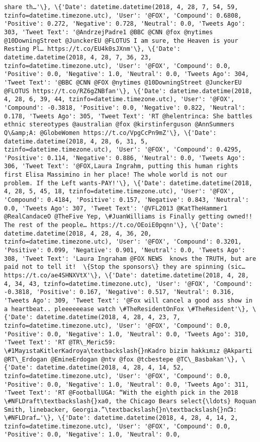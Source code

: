 \documentclass[11pt]{article}
\begin{document}
\begin{Verbatim}[commandchars=\\\{\}]
share th…'\}, \{'Date': datetime.datetime(2018, 4, 28, 7, 54, 59, tzinfo=datetime.timezone.utc), 'User': '@FOX', 'Compound': 0.6808, 'Positive': 0.272, 'Negative': 0.728, 'Neutral': 0.0, 'Tweets Ago': 303, 'Tweet Text': '@AndrzejPadre1 @BBC @CNN @fox @nytimes @10DowningStreet @JunckerEU @FLOTUS I am sure, the Heaven is your Resting Pl… https://t.co/EU4k0sJXnm'\}, \{'Date': datetime.datetime(2018, 4, 28, 7, 36, 23, tzinfo=datetime.timezone.utc), 'User': '@FOX', 'Compound': 0.0, 'Positive': 0.0, 'Negative': 1.0, 'Neutral': 0.0, 'Tweets Ago': 304, 'Tweet Text': '@BBC @CNN @FOX @nytimes @10DowningStreet @JunckerEU @FLOTUS https://t.co/RZ6gZNBfan'\}, \{'Date': datetime.datetime(2018, 4, 28, 6, 39, 44, tzinfo=datetime.timezone.utc), 'User': '@FOX', 'Compound': -0.3818, 'Positive': 0.0, 'Negative': 0.822, 'Neutral': 0.178, 'Tweets Ago': 305, 'Tweet Text': 'RT @helentrinca: She battles ethnic stereotypes @australian @fox @kirstinferguson @AnnSummers Q\&amp;A: @GlobeWomen https://t.co/VpgCcPn9mZ'\}, \{'Date': datetime.datetime(2018, 4, 28, 6, 31, 5, tzinfo=datetime.timezone.utc), 'User': '@FOX', 'Compound': 0.4295, 'Positive': 0.114, 'Negative': 0.886, 'Neutral': 0.0, 'Tweets Ago': 306, 'Tweet Text': '@FOX,Laura Ingrahm, putting this human rights first Elisa Massimino in her place! The whole world is not our problem. If the Left wants-PAY!'\}, \{'Date': datetime.datetime(2018, 4, 28, 5, 45, 18, tzinfo=datetime.timezone.utc), 'User': '@FOX', 'Compound': 0.4184, 'Positive': 0.157, 'Negative': 0.843, 'Neutral': 0.0, 'Tweets Ago': 307, 'Tweet Text': '@VFL2013 @KatTheHammer1 @RealCandaceO @TheFive Yep, \#JuanWilliams is Finally getting owned!! The rest of the people… https://t.co/OEoiE0pqnn'\}, \{'Date': datetime.datetime(2018, 4, 28, 4, 36, 20, tzinfo=datetime.timezone.utc), 'User': '@FOX', 'Compound': 0.3201, 'Positive': 0.099, 'Negative': 0.901, 'Neutral': 0.0, 'Tweets Ago': 308, 'Tweet Text': 'Laura Ingraham @FOX NEWS  knows the TRUTH, but are paid not to tell it!  \{Stop the sponsors\} they are spinning (sic… https://t.co/ae4SHNXVtX'\}, \{'Date': datetime.datetime(2018, 4, 28, 4, 34, 43, tzinfo=datetime.timezone.utc), 'User': '@FOX', 'Compound': -0.3818, 'Positive': 0.167, 'Negative': 0.517, 'Neutral': 0.316, 'Tweets Ago': 309, 'Tweet Text': '@Fox will cancel a good ass show in a heartbeat.. pleeeeeease watch \#TheResidentOnFox \#TheResident'\}, \{'Date': datetime.datetime(2018, 4, 28, 4, 23, 7, tzinfo=datetime.timezone.utc), 'User': '@FOX', 'Compound': 0.0, 'Positive': 0.0, 'Negative': 1.0, 'Neutral': 0.0, 'Tweets Ago': 310, 'Tweet Text': 'RT @TR\_Meric59: \#1MayıstaKitlerKadroya\textbackslash{}nKadro bizim hakkımız @Akparti @RT\_Erdogan @EmineErdogan @ntv @fox @tcbestepe @TC\_Basbakan'\}, \{'Date': datetime.datetime(2018, 4, 28, 4, 14, 52, tzinfo=datetime.timezone.utc), 'User': '@FOX', 'Compound': 0.0, 'Positive': 0.0, 'Negative': 1.0, 'Neutral': 0.0, 'Tweets Ago': 311, 'Tweet Text': 'RT @FootballUGA: “With the eighth pick in the 2018 \#NFLDraft\textbackslash{}xa0, the Chicago Bears select{\ldots} Roquan Smith, linebacker, Georgia.”\textbackslash{}n\textbackslash{}n📺: \#NFLDraf…'\}, \{'Date': datetime.datetime(2018, 4, 28, 4, 14, 2, tzinfo=datetime.timezone.utc), 'User': '@FOX', 'Compound': 0.0, 'Positive': 0.0, 'Negative': 1.0, 'Neutral': 0.0, 
\end{Verbatim}
\end{document}
